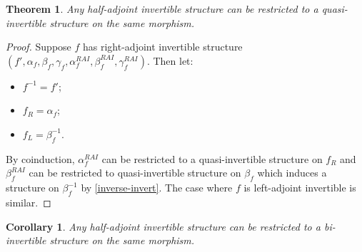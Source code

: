 \documentclass[draft]{article}
\newtheorem{theorem}{Theorem} \newtheorem{prop}{Proposition}
\newtheorem{cor}{Corollary} \newtheorem{lemma}{Lemma}
\theoremstyle{definition} \newtheorem{definition}{Definition}
\theoremstyle{remark} \newtheorem{remark}{Remark}
\newcommand{\inv}[1]{#1^{-1}} \newcommand{\comp}{\star}
\begin{document}
\begin{theorem}
  Any half-adjoint invertible structure can be restricted to a
  quasi-invertible structure on the same morphism.
\end{theorem}
\begin{proof}
  Suppose \(f\) has right-adjoint invertible structure \((f',
  \alpha_f, \beta_f, \gamma_f, \alpha_f^{RAI}, \beta_f^{RAI},
  \gamma_f^{RAI})\). Then let:
  \begin{itemize}
  \item \(\inv f = {f'}\);
  \item \(f_R = \alpha_f\);
  \item \(f_L = \beta_f^{-1}\).
  \end{itemize}
  By coinduction, \(\alpha_f^{RAI}\) can be restricted to a
  quasi-invertible structure on \(f_R\) and \(\beta_f^{RAI}\) can be
  restricted to quasi-invertible structure on \(\beta_f\) which
  induces a structure on \(\inv {\beta_f}\) by \cref{inverse-invert}.
  The case where \(f\) is left-adjoint invertible is similar.
\end{proof}

\begin{cor}
  Any half-adjoint invertible structure can be restricted to a
  bi-invertible structure on the same morphism.
\end{cor}
\end{document}
